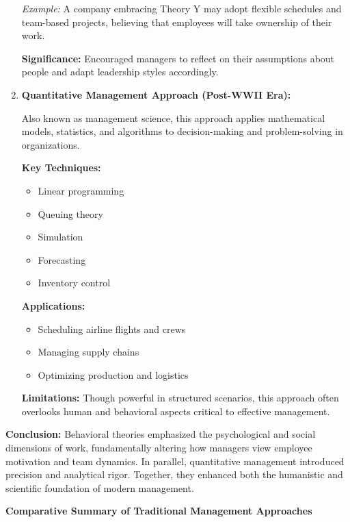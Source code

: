 \documentclass[12pt,a4paper]{book}
\begin{document}
\begin{enumerate}
    \textit{Example:} A company embracing Theory Y may adopt flexible schedules and team-based projects, believing that employees will take ownership of their work.

    \textbf{Significance:} Encouraged managers to reflect on their assumptions about people and adapt leadership styles accordingly.

    \item \textbf{Quantitative Management Approach (Post-WWII Era):}

    Also known as management science, this approach applies mathematical models, statistics, and algorithms to decision-making and problem-solving in organizations.

    \textbf{Key Techniques:}
    \begin{itemize}
        \item Linear programming
        \item Queuing theory
        \item Simulation
        \item Forecasting
        \item Inventory control
    \end{itemize}

    \textbf{Applications:}
    \begin{itemize}
        \item Scheduling airline flights and crews
        \item Managing supply chains
        \item Optimizing production and logistics
    \end{itemize}

    \textbf{Limitations:} Though powerful in structured scenarios, this approach often overlooks human and behavioral aspects critical to effective management.

\end{enumerate}

\textbf{Conclusion:} Behavioral theories emphasized the psychological and social dimensions of work, fundamentally altering how managers view employee motivation and team dynamics. In parallel, quantitative management introduced precision and analytical rigor. Together, they enhanced both the humanistic and scientific foundation of modern management.


\textbf{Comparative Summary of Traditional Management Approaches}
\end{document}
